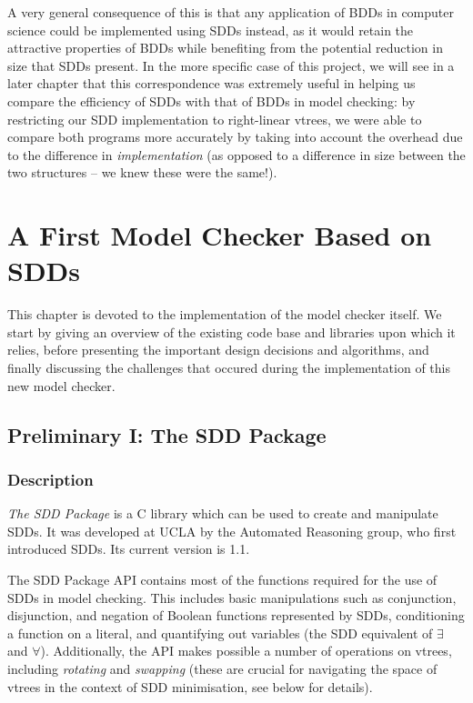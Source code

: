 \documentclass[11pt]{article}
\begin{document}
A very general consequence of this is that any application of BDDs in computer science could be implemented using SDDs instead, as it would retain the attractive properties of BDDs while benefiting from the potential reduction in size that SDDs present. In the more specific case of this project, we will see in a later chapter that this correspondence was extremely useful in helping us compare the efficiency of SDDs with that of BDDs in model checking: by restricting our SDD implementation to right-linear vtrees, we were able to compare both programs more accurately by taking into account the overhead due to the difference in \textit{implementation} (as opposed to a difference in size between the two structures -- we knew these were the same!).


\section{A First Model Checker Based on SDDs}

This chapter is devoted to the implementation of the model checker itself. We start by giving an overview of the existing code base and libraries upon which it relies, before presenting the important design decisions and algorithms, and finally discussing the challenges that occured during the implementation of this new model checker. 

\subsection{Preliminary I: The SDD Package}

\subsubsection{Description}

\textit{The SDD Package} is a C library which can be used to create and manipulate SDDs. It was developed at UCLA by the Automated Reasoning group, who first introduced SDDs. Its current version is 1.1.  


The SDD Package API contains most of the functions required for the use of SDDs in model checking. This includes basic manipulations such as conjunction, disjunction, and negation of Boolean functions represented by SDDs, conditioning a function on a literal, and quantifying out variables (the SDD equivalent of $\exists$ and $\forall$). Additionally, the API makes possible a number of operations on vtrees, including \textit{rotating }and \textit{swapping} (these are crucial for navigating the space of vtrees in the context of SDD minimisation, see below for details). 
\end{document}
